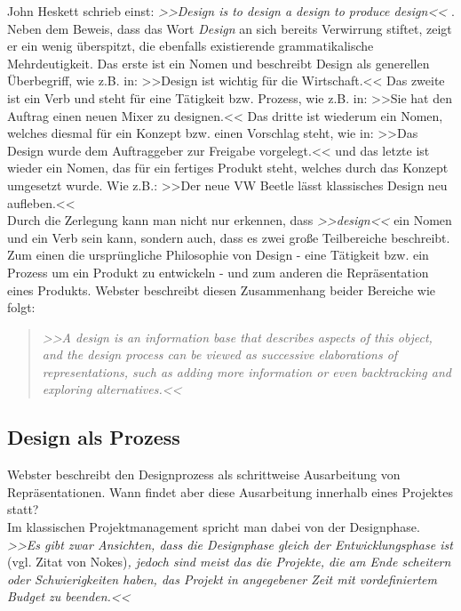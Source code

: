 \medskip John Heskett schrieb einst: \emph{>>Design is to design a design to produce design<<} \citep{Heskett:2005}. Neben dem Beweis, dass das Wort \emph{Design} an sich bereits Verwirrung stiftet, zeigt er ein wenig überspitzt, die ebenfalls existierende grammatikalische Mehrdeutigkeit. Das erste ist ein Nomen und beschreibt Design als generellen Überbegriff, wie z.B. in: >>Design ist wichtig für die Wirtschaft.<< Das zweite ist ein Verb und steht für eine Tätigkeit bzw. Prozess, wie z.B. in: >>Sie hat den Auftrag einen neuen Mixer zu designen.<< Das dritte ist wiederum ein Nomen, welches diesmal für ein Konzept bzw. einen Vorschlag steht, wie in: >>Das Design wurde dem Auftraggeber zur Freigabe vorgelegt.<< und das letzte ist wieder ein Nomen, das für ein fertiges Produkt steht, welches durch das Konzept umgesetzt wurde. Wie z.B.: >>Der neue VW Beetle lässt klassisches Design neu aufleben.<< \citep{Heskett:2005}\\
Durch die Zerlegung kann man nicht nur erkennen, dass \emph{>>design<<} ein Nomen und ein Verb sein kann, sondern auch, dass es zwei große Teilbereiche beschreibt. Zum einen die ursprüngliche Philosophie von Design - eine Tätigkeit bzw. ein Prozess um ein Produkt zu entwickeln - und zum anderen die Repräsentation eines Produkts. Webster beschreibt diesen Zusammenhang beider Bereiche wie folgt:
\begin{quote}
\slshape >>A design is an information base that describes aspects of this object, and the design process can be viewed as successive elaborations of representations, such as adding more information or even backtracking and exploring alternatives.<< 
\begin{flushright}\citep{Webster:1988}\end{flushright}
\end{quote}

\subsection{Design als Prozess} 
Webster beschreibt den Designprozess als schrittweise Ausarbeitung von Repräsentationen. Wann findet aber diese Ausarbeitung innerhalb eines Projektes statt? \\
Im klassischen Projektmanagement spricht man dabei von der Designphase. \emph{>>Es gibt zwar Ansichten, dass die Designphase gleich der Entwicklungsphase ist} (vgl. Zitat von Nokes)\emph{, jedoch sind meist das die Projekte, die am Ende scheitern oder Schwierigkeiten haben, das Projekt in angegebener Zeit mit vordefiniertem Budget zu beenden.<<} \citep{Sagmeister:2008}

